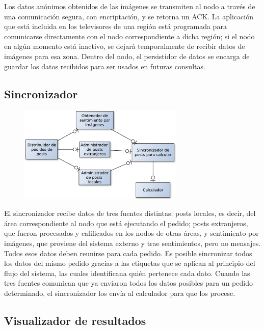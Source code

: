Los datos anónimos obtenidos de las imágenes se transmiten al nodo a través de una comunicación segura, con encriptación, y se retorna un ACK. La aplicación que está incluida en los televisores de una región está programada para comunicarse directamente con el nodo correspondiente a dicha región; si el nodo en algún momento está inactivo, se dejará temporalmente de recibir datos de imágenes para esa zona. Dentro del nodo, el persistidor de datos se encarga de guardar los datos recibidos para ser usados en futuras consultas.

\subsection{Sincronizador}

\begin{figure}[H]
\centering
\includegraphics[width=0.7\textwidth]{graph/sincro.pdf}
\end{figure}

El sincronizador recibe datos de tres fuentes distintas: posts locales, es decir, del área correspondiente al nodo que está ejecutando el pedido; posts extranjeros, que fueron procesados y calificados en los nodos de otras áreas, y sentimiento por imágenes, que proviene del sistema externo y trae sentimientos, pero no mensajes. Todos esos datos deben reunirse para cada pedido. Es posible sincronizar todos los datos del mismo pedido gracias a las etiquetas que se aplican al principio del flujo del sistema, las cuales identificana quién pertenece cada dato. Cuando las tres fuentes comunican que ya enviaron todos los datos posibles para un pedido determinado, el sincronizador los envía al calculador para que los procese.

\subsection{Visualizador de resultados}

